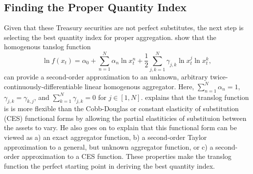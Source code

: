 \documentclass[11pt,a4paper,margin=1.5in]{article}
\begin{document}








\subsection{Finding the Proper Quantity Index}
\label{subsec:Hurdles}
Given that these Treasury securities are not perfect substitutes, the next step is selecting the best quantity index for proper aggregation.
\citet{Christensen-Jorgenson-Lau:1971} show that the homogenous tanslog function 
$$ \ln f(x_t) = \alpha_0 + \sum_{n=1}^N \alpha_n \ln x^n_t + \frac{1}{2}\sum_{j,k=1}^N \gamma_{j,k} \ln x^j_t \ln x^k_t, $$
can provide a second-order approximation to an unknown, arbitrary twice-continuously-differentiable linear homogenous aggregator.
Here, $\sum_{n=1}^{N} \alpha_n = 1$, $\gamma_{j,k} = \gamma_{k,j}$, and $\sum_{k=1}^{N} \gamma_{j,k} = 0$ for $j \in [1,N]$.
\citet{Boisvert:1982} explains that the translog function is is more flexible than the Cobb-Douglas or constant elasticity of substitution (CES) functional forms by allowing the partial elastiticies of substituion between the assets to vary.
He also goes on to explain that this functional form can be viewed as a) an exact aggregator function, b) a second-order Taylor approximation to a general, but unknown aggregator function, or c) a second-order approximation to a CES function.
These properties make the translog function the perfect starting point in deriving the best quantity index.
\end{document}
